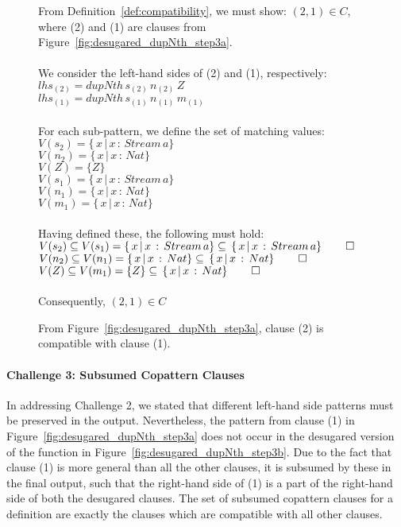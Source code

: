 \begin{figure}
From
Definition~\ref{def:compatibility}, we must show: $(2,1)\in C$, where (2) and (1) are clauses from
Figure~\ref{fig:desugared_dupNth_step3a}.
\\\\
We consider the left-hand sides of (2) and (1), respectively:\\
$lhs_{(2)} = dupNth\,s_{(2)}\,n_{(2)}\,Z$\\
$lhs_{(1)} = dupNth\,s_{(1)}\,n_{(1)}\,m_{(1)}$\\
\\
For each sub-pattern, we define the set of matching values:\\
$V(s_{2}) = \{\,x\,|\,x\,:\,Stream\,a\}$\\
$V(n_{2}) = \{\,x\,|\,x\,:\,Nat\}$\\
$V(Z) = \{Z\}$\\
$V(s_{1}) = \{\,x\,|\,x\,:\,Stream\,a\}$\\
$V(n_{1}) = \{\,x\,|\,x\,:\,Nat\}$\\
$V(m_{1}) = \{\,x\,|\,x\,:\,Nat\}$\\
\\
Having defined these, the following must hold:
\\
$V(s_{2})\subseteq V(s_{1}) = \{\,x\,|\,x\,:\,Stream\,a\}\subseteq\,\{\,x\,|\,x\,:\,Stream\,a\}\,\qed$\\
$V(n_{2})\subseteq V(n_{1}) =
\{\,x\,|\,x\,:\,Nat\}\subseteq\,\{\,x\,|\,x\,:\,Nat\}\,\qed$\\
$V(Z)\subseteq V(m_{1}) = \{Z\}\subseteq\,\{\,x\,|\,x\,:\,Nat\}\,\qed$\\\\
Consequently, $(2,1)\in C$
  \caption{From Figure~\ref{fig:desugared_dupNth_step3a}, clause (2) is
    compatible with clause (1).}
  \label{fig:compatibility_proof}
\end{figure}


\paragraph{Challenge 3: Subsumed Copattern Clauses}
In addressing Challenge 2, we stated that different left-hand side patterns must
be preserved in the output. Nevertheless, the pattern from clause (1) in
Figure~\ref{fig:desugared_dupNth_step3a} does not occur in the
desugared version of the function in
Figure~\ref{fig:desugared_dupNth_step3b}. Due to the fact that clause (1) is
more general than all the other clauses, it is subsumed by these in the final
output, such that the right-hand side of (1) is a part of the right-hand side of
both the desugared clauses. The set of subsumed copattern clauses for a
definition are exactly the clauses which are compatible with all other clauses.  

